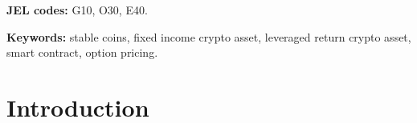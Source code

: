 \documentclass[11pt]{article}%
\numberwithin{equation}{section}
\theoremstyle{plain}
\newcommand{\Ap}{A\ensuremath{^\prime}~}
\newcommand{\Bp}{B\ensuremath{^\prime}~}
\begin{document}


\vspace{0.1in}\indent\textbf{JEL codes:}  G10, O30, E40.

\vspace{0.1in}\indent\textbf{Keywords:}
stable coins, fixed income crypto asset, leveraged return crypto asset, smart contract, option pricing.











%


\section{Introduction}
\end{document}
